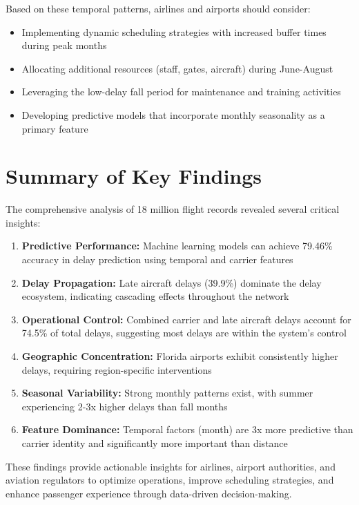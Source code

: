 \documentclass[12pt,a4paper]{report}
\begin{document}
Based on these temporal patterns, airlines and airports should consider:

\begin{itemize}
    \item Implementing dynamic scheduling strategies with increased buffer times during peak months
    \item Allocating additional resources (staff, gates, aircraft) during June-August
    \item Leveraging the low-delay fall period for maintenance and training activities
    \item Developing predictive models that incorporate monthly seasonality as a primary feature
\end{itemize}

\section{Summary of Key Findings}

The comprehensive analysis of 18 million flight records revealed several critical insights:

\begin{enumerate}
    \item \textbf{Predictive Performance:} Machine learning models can achieve 79.46\% accuracy in delay prediction using temporal and carrier features
    \item \textbf{Delay Propagation:} Late aircraft delays (39.9\%) dominate the delay ecosystem, indicating cascading effects throughout the network
    \item \textbf{Operational Control:} Combined carrier and late aircraft delays account for 74.5\% of total delays, suggesting most delays are within the system's control
    \item \textbf{Geographic Concentration:} Florida airports exhibit consistently higher delays, requiring region-specific interventions
    \item \textbf{Seasonal Variability:} Strong monthly patterns exist, with summer experiencing 2-3x higher delays than fall months
    \item \textbf{Feature Dominance:} Temporal factors (month) are 3x more predictive than carrier identity and significantly more important than distance
\end{enumerate}

These findings provide actionable insights for airlines, airport authorities, and aviation regulators to optimize operations, improve scheduling strategies, and enhance passenger experience through data-driven decision-making.
\end{document}
